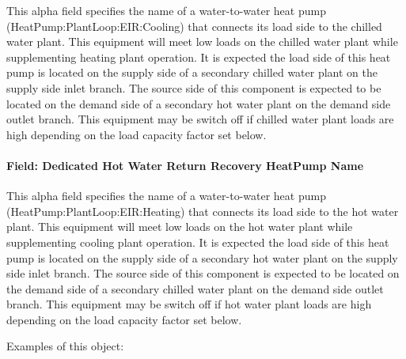 This alpha field specifies the name of a water-to-water heat pump (HeatPump:PlantLoop:EIR:Cooling) that connects its load side to the chilled water plant. This equipment will meet low loads on the chilled water plant while supplementing heating plant operation. It is expected the load side of this heat pump is located on the supply side of a secondary chilled water plant on the supply side inlet branch. The source side of this component is expected to be located on the demand side of a secondary hot water plant on the demand side outlet branch. This equipment may be switch off if chilled water plant loads are high depending on the load capacity factor set below.

\paragraph{Field: Dedicated Hot Water Return Recovery HeatPump Name}\label{field-dedicated-hot-return-recovery-hp-name-plantequipmentoperationchillerheaterchangeover}

This alpha field specifies the name of a water-to-water heat pump (HeatPump:PlantLoop:EIR:Heating) that connects its load side to the hot water plant. This equipment will meet low loads on the hot water plant while supplementing cooling plant operation. It is expected the load side of this heat pump is located on the supply side of a secondary hot water plant on the supply side inlet branch. The source side of this component is expected to be located on the demand side of a secondary chilled water plant on the demand side outlet branch. This equipment may be switch off if hot water plant loads are high depending on the load capacity factor set below.

Examples of this object:

